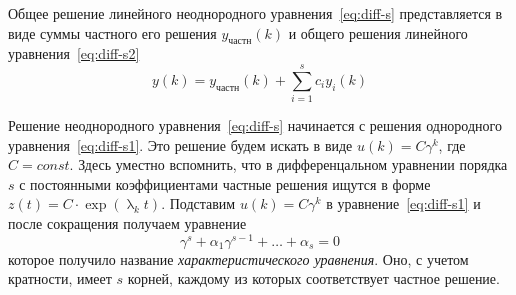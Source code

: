 \begin{theorem}
    Общее решение линейного неоднородного уравнения~\eqref{eq:diff-s} представляется в виде суммы частного его решения
    $\displaystyle y_{\textit{частн}}(k)$ и общего решения линейного уравнения~\eqref{eq:diff-s2}
    \begin{equation*}
        y(k) = y_{\textit{частн}}(k) + \sum_{i=1}^{s} c_i y_i (k)
    \end{equation*}
\end{theorem}
Решение неоднородного уравнения~\eqref{eq:diff-s} начинается с решения однородного
уравнения~\eqref{eq:diff-s1}. Это решение будем искать в виде $\displaystyle u(k) = C\gamma^k$, где
$\displaystyle C = const$. Здесь уместно вспомнить, что в дифференцальном уравнении порядка $s$ с постоянными
коэффициентами частные решения ищутся в форме $\displaystyle z(t) = C \cdot \exp(\uplambda_k t)$. Подставим
$\displaystyle u(k) = C\gamma^k$ в уравнение~\eqref{eq:diff-s1} и после сокращения получаем уравнение
\begin{equation}
    \gamma^s + \alpha_1 \gamma^{s-1} + \dots + \alpha_s = 0
\end{equation}
которое получило название \emph{характеристического уравнения}. Оно, с учетом кратности,
имеет $s$ корней, каждому из которых соответствует частное решение.
